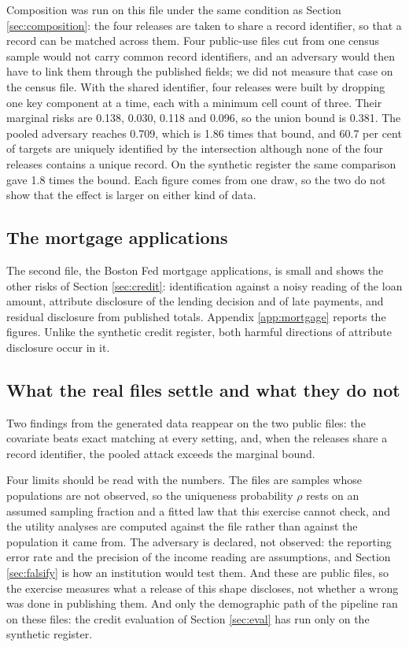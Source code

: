 \documentclass[11pt,a4paper]{article}
\theoremstyle{plain}
\theoremstyle{definition}
\theoremstyle{definition}
\theoremstyle{plain}
\begin{document}
Composition was run on this file under the same condition as Section
\ref{sec:composition}: the four releases are taken to share a record identifier,
so that a record can be matched across them. Four public-use files cut from one
census sample would not carry common record identifiers, and an adversary would
then have to link them through the published fields; we did not measure that case
on the census file. With the shared identifier, four releases were built by
dropping one key component at a time, each with a minimum cell count of three.
Their marginal risks are 0.138, 0.030, 0.118 and 0.096, so the union bound is
0.381. The pooled adversary reaches 0.709, which is 1.86 times that bound, and
60.7 per cent of targets are uniquely identified by the intersection although none
of the four releases contains a unique record. On the synthetic register the same
comparison gave 1.8 times the bound. Each figure comes from one draw, so the two
do not show that the effect is larger on either kind of data.

\subsection{The mortgage applications}

The second file, the Boston Fed mortgage applications, is small and shows the
other risks of Section \ref{sec:credit}: identification against a noisy reading
of the loan amount, attribute disclosure of the lending decision and of late
payments, and residual disclosure from published totals. Appendix
\ref{app:mortgage} reports the figures. Unlike the synthetic credit register,
both harmful directions of attribute disclosure occur in it.

\subsection{What the real files settle and what they do not}

Two findings from the generated data reappear on the two public files: the
covariate beats exact matching at every setting, and, when the releases share a
record identifier, the pooled attack exceeds the marginal bound.

Four limits should be read with the numbers. The files are samples whose
populations are not observed, so the uniqueness probability $\rho$ rests on an assumed
sampling fraction and a fitted law that this exercise cannot check, and the utility analyses are computed against the file
rather than against the population it came from. The adversary is declared, not
observed: the reporting error rate and the precision of the income reading are
assumptions, and Section \ref{sec:falsify} is how an institution would test them.
And these are public files, so the exercise measures what a release of this shape
discloses, not whether a wrong was done in publishing them. And only the
demographic path of the pipeline ran on these files: the credit evaluation of
Section \ref{sec:eval} has run only on the synthetic register.
\end{document}
